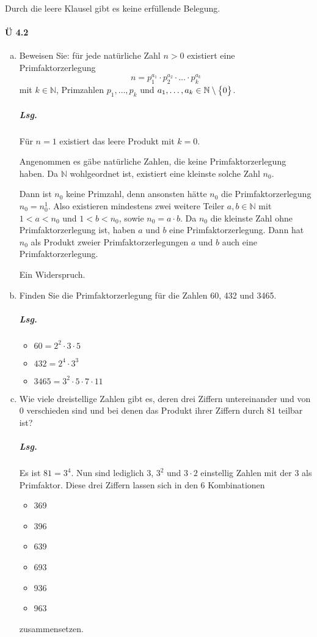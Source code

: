 \documentclass{scrreprt}
\begin{document}
\begin{enumerate}[(1)]
  Durch die leere Klausel gibt es keine erfüllende Belegung.
\end{enumerate}

\newpage
\paragraph{Ü 4.2}
\begin{enumerate}[(a)]
\item Beweisen Sie: für jede natürliche Zahl $n > 0$ existiert eine
  Primfaktorzerlegung
  \[
    n = p_1^{a_1} \cdot p_2^{a_2} \cdot \ldots \cdot p_k^{a_k}
  \]
  mit $k \in \mathbb{N}$, Primzahlen $p_1, \ldots, p_k$ und
  $a_1, \ldots, a_k \in \mathbb{N} \setminus \qty\big{0}$.

  \subparagraph{Lsg.} Für $n = 1$ existiert das leere Produkt mit $k = 0$.

  Angenommen es gäbe natürliche Zahlen, die keine Primfaktorzerlegung haben.
  Da $\mathbb{N}$ wohlgeordnet ist, existiert eine kleinste solche Zahl $n_0$.

  Dann ist $n_0$ keine Primzahl, denn ansonsten hätte $n_0$ die Primfaktorzerlegung
  $n_0 = n_0^1$.
  Also existieren mindestens zwei weitere Teiler $a, b \in \mathbb{N}$ mit
  $1 < a < n_0$ und $1 < b < n_0$, sowie $n_0 = a \cdot b$.
  Da $n_0$ die kleinste Zahl ohne Primfaktorzerlegung ist, haben $a$ und $b$ eine
  Primfaktorzerlegung.
  Dann hat $n_0$ als Produkt zweier Primfaktorzerlegungen $a$ und $b$ auch eine
  Primfaktorzerlegung.

  Ein Widerspruch.

\item Finden Sie die Primfaktorzerlegung für die Zahlen 60, 432 und 3465.

  \subparagraph{Lsg.}
  \begin{itemize}
  \item $60 = 2^2 \cdot 3 \cdot 5$
  \item $432 = 2^4 \cdot 3^3$
  \item $3465 = 3^2 \cdot 5 \cdot 7 \cdot 11$
  \end{itemize}

\item Wie viele dreistellige Zahlen gibt es, deren drei Ziffern untereinander
  und von 0 verschieden sind und bei denen das Produkt ihrer Ziffern durch 81
  teilbar ist?

  \subparagraph{Lsg.} Es ist $81 = 3^4$.
  Nun sind lediglich $3$, $3^2$ und $3 \cdot 2$ einstellig
  Zahlen mit der $3$ als Primfaktor.
  Diese drei Ziffern lassen sich in den 6 Kombinationen
  \begin{itemize}
  \item 369
  \item 396
  \item 639
  \item 693
  \item 936
  \item 963
  \end{itemize}
  zusammensetzen.
\end{enumerate}
\end{document}
